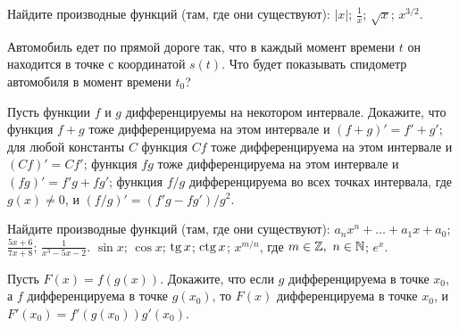 \documentclass[a4paper,12pt]{article}
\begin{document}

 Найдите производные функций (там, где они существуют):
 $|x|$;
 $\frac{1}{x}$;
 $\sqrt{x}$;
 $x^{3/2}$.





 Автомобиль едет по прямой дороге так, что в
каждый момент времени $t$ он находится в точке с координатой $s(t)$.
Что будет показывать спидометр автомобиля в момент времени $t_0$?



 Пусть функции $f$ и $g$ дифференцируемы на некотором интервале.
Докажите, что
 функция $f+g$ тоже дифференцируема на этом
интервале и $(f+g)'=f'+g'$;
 для любой константы $C$ функция $Cf$ тоже дифференцируема на этом
интервале и $(Cf)'=Cf'$;
 функция $fg$ тоже дифференцируема на этом
интервале и $(fg)'=f'g+fg'$;
 функция $f/g$ дифференцируема во всех точках
интервала, где $g(x)\ne 0$, и $(f/g)'=(f'g-fg')/g^2$.

 Найдите производные функций (там, где они существуют):
 $a_nx^n+\ldots +a_1x+a_0$;
 $\frac{5x+6}{7x+8}$;
 $\frac{1}{x^3-5x-2}$.
 $\sin x$;
 $\cos x$;
 $\tg x$;
 $\ctg x$;
 $x^{m/n}$, где $m\in\mathbb{Z},\ n\in\mathbb{N}$;
 $e^x$.

Пусть $F(x)=f(g(x))$. Докажите, что
если %
$g$ дифференцируема в точке $x_0$, а %
$f$
дифференцируема в точке $g(x_0)$, то $F(x)$ дифференцируема в точке
$x_0$, и $F'(x_0)=f'(g(x_0))g'(x_0)$.

\end{document}
